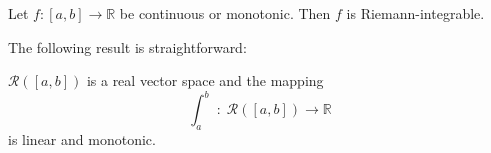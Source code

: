 \begin{Theorem}{}
Let $f:[a,b]\to\mathbb{R}$ be continuous or monotonic. Then $f$ is Riemann-integrable.
\end{Theorem}

The following result is straightforward:

\begin{Theorem}{}
$\mathcal{R}([a,b])$ is a real vector space and the mapping
\[\int_a^b\;:\;\mathcal{R}([a,b])\to\mathbb{R}\]
is linear and monotonic.
\end{Theorem}


